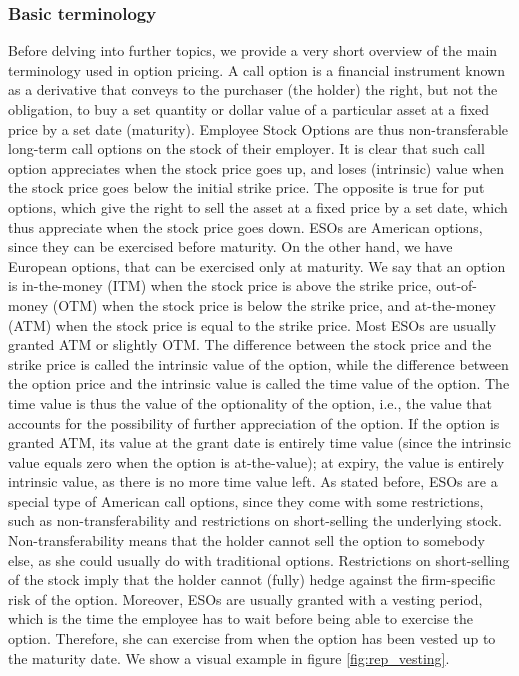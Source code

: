 \subsubsection{Basic terminology}
    Before delving into further topics, we provide a very short overview of the main terminology used in option pricing.
    A call option is a financial instrument known as a derivative that conveys to the purchaser (the holder) the right, but not the obligation, to buy a set quantity or dollar value of a particular asset at a fixed price by a set date (maturity). Employee Stock Options are thus non-transferable long-term call options on the stock of their employer. It is clear that such call option appreciates when the stock price goes up, and loses (intrinsic) value when the stock price goes below the initial strike price. The opposite is true for put options, which give the right to sell the asset at a fixed price by a set date, which thus appreciate when the stock price goes down.
    ESOs are American options, since they can be exercised before maturity. On the other hand, we have European options, that can be exercised only at maturity. We say that an option is in-the-money (ITM) when the stock price is above the strike price, out-of-money (OTM) when the stock price is below the strike price, and at-the-money (ATM) when the stock price is equal to the strike price. Most ESOs are usually granted ATM or slightly OTM. 
    The difference between the stock price and the strike price is called the intrinsic value of the option, while the difference between the option price and the intrinsic value is called the time value of the option. The time value is thus the value of the optionality of the option, i.e., the value that accounts for the possibility of further appreciation of the option. If the option is granted ATM, its value at the grant date is entirely time value (since the intrinsic value equals zero when the option is at-the-value); at expiry, the value is entirely intrinsic value, as there is no more time value left.
    As stated before, ESOs are a special type of American call options, since they come with some restrictions, such as non-transferability and restrictions on short-selling the underlying stock. Non-transferability means that the holder cannot sell the option to somebody else, as she could usually do with traditional options. Restrictions on short-selling of the stock imply that the holder cannot (fully) hedge against the firm-specific risk of the option. Moreover, ESOs are usually granted with a vesting period, which is the time the employee has to wait before being able to exercise the option. Therefore, she can exercise from when the option has been vested up to the maturity date. We show a visual example in figure \ref{fig:rep_vesting}. 

